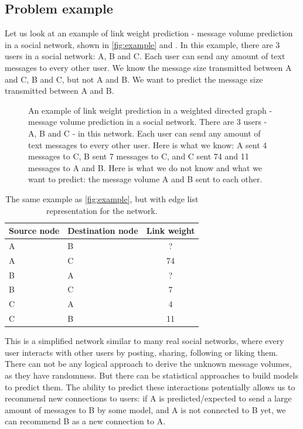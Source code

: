 \documentclass[letterpaper]{article}
\begin{document}
\subsection{Problem example}
Let us look at an example of link weight prediction - message volume prediction in a social network, shown in \autoref{fig:example} and .
In this example, there are 3 users in a social network: A, B and C.
Each user can send any amount of text messages to every other user.
We know the message size transmitted between A and C, B and C, but not A and B.
We want to predict the message size transmitted between A and B.
\begin{figure}[!htb]\centering
	\caption{
		An example of link weight prediction in a weighted directed graph -
		message volume prediction in a social network.
		There are 3 users - A, B and C - in this network.
		Each user can send any amount of text messages to every other user.
		Here is what we know:
		A sent 4 messages to C,
		B sent 7 messages to C,
		and C sent 74 and 11 messages to A and B.
		Here is what we do not know and what we want to predict:
		the message volume A and B sent to each other.
		}
	\label{fig:example}
\end{figure}
\begin{table}[!htb]\centering
	\caption{
		The same example as \autoref{fig:example}, but with edge list representation for the network.
	}
	\begin{tabularx}{\textwidth}{|X|X|c|}  \hline \rowcolor{blue!50}
		Source node & Destination node & Link weight \\ \hline
		A & B & ? \\ \hline
		A & C & 74 \\ \hline
		B & A & ? \\ \hline
		B & C & 7 \\ \hline
		C & A & 4 \\ \hline
		C & B & 11 \\ \hline
	\end{tabularx}
	\label{tab:example}
\end{table}
This is a simplified network similar to many real social networks, where every user interacts with other users by posting, sharing, following or liking them.
There can not be any logical approach to derive the unknown message volumes,
as they have randomness.
But there can be statistical approaches to build models to predict them.
The ability to predict these interactions potentially allows us to recommend new connections to users:
if A is predicted/expected to send a large amount of messages to B by some model,
and A is not connected to B yet,
we can recommend B as a new connection to A.
\end{document}
